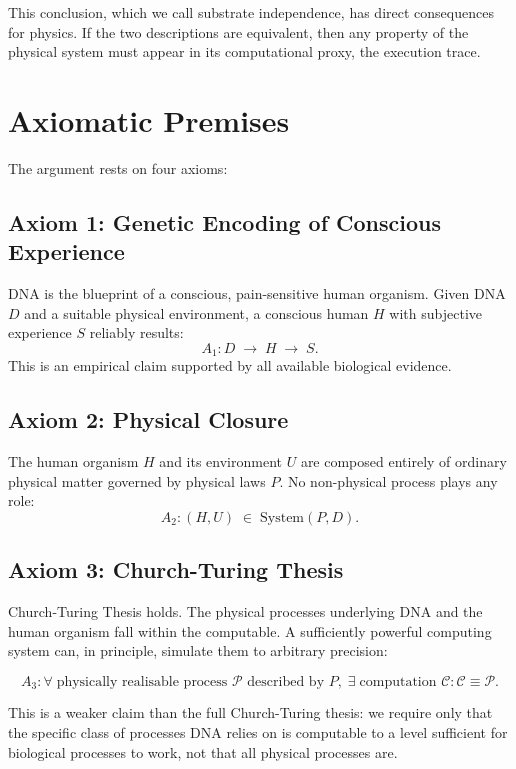 \documentclass[11pt]{article}
\begin{document}
This conclusion, which we call substrate independence,
has direct consequences for physics. If the two
descriptions are equivalent, then any property of the physical system must
appear in its computational proxy, the execution trace. 


\section{Axiomatic Premises}
\label{sec:axioms}

The argument rests on four axioms:

\subsection*{Axiom 1: Genetic Encoding of Conscious Experience}

DNA is the blueprint of a conscious, pain-sensitive human organism. Given
DNA $D$ and a suitable physical environment, a conscious human $H$ with
subjective experience $S$ reliably results:
\[
A_1: D \;\rightarrow\; H \;\rightarrow\; S.
\]
This is an empirical claim supported by all available biological evidence.


\subsection*{Axiom 2: Physical Closure}

The human organism $H$ and its environment $U$ are composed entirely of
ordinary physical matter governed by physical laws $P$. No non-physical
process plays any role:
\[
A_2: (H, U) \;\in\; \mathrm{System}(P, D).
\]


\subsection*{Axiom 3: Church-Turing Thesis}

Church-Turing Thesis holds. The physical processes underlying DNA and the human organism fall within the
computable. A sufficiently powerful computing system can, in principle,
simulate them to arbitrary precision:

\[
A_3: \forall\; \text{physically realisable process } \mathcal{P}
\text{ described by } P,\;
\exists\; \text{computation } \mathcal{C} : \mathcal{C} \equiv \mathcal{P}.
\]

This is a weaker claim than the full Church-Turing thesis: we require only
that the specific class of processes DNA relies on is computable to a level
sufficient for biological processes to work, not that
all physical processes are. 
\end{document}
